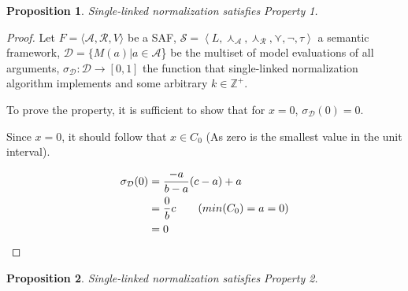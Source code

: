 \documentclass{article}
\newtheorem{proposition}{Proposition}
\newcommand{\real}{\mathbb{R}}  %
\newcommand{\args}{\mathcal{A}} %
\newcommand{\att}{\mathcal{R}}  %
\newcommand{\valueset}{L}
\newcommand{\safid}{F}               %
\newcommand{\saf}{\safid = \safbody} %
\newcommand{\safbody}{\langle \args, \att, V \rangle} %
\newcommand{\sembodyNew}{\left\langle \valueset,\SAFand_\mathcal{A}, \SAFand_\mathcal{R},\SAFor,\lnot,\tau \right\rangle} %
\newcommand{\SAFand}{\curlywedge}     %
\newcommand{\SAFor}{\curlyvee}        %
\newcommand{\sem}{\mathcal{S}}
\newcommand{\dataset}{\mathcal{D}}   %
\begin{document}
\begin{proposition}
Single-linked normalization satisfies Property 1.
\end{proposition}

\begin{proof}
Let $\saf$ be a SAF, $\sem = \sembodyNew$ a semantic framework, $\dataset = \{M(a)|a \in \args$\} be the multiset of model evaluations of all arguments, $\sigma_{\dataset}: \dataset  \rightarrow  [0,1]$ the function that single-linked normalization algorithm implements and some arbitrary $k \in \mathbb{Z}^{+}$. %


To prove the property, it is sufficient to show that for $x= 0$, $\sigma_{\dataset}(0)=0$.

Since $x = 0$, it should follow that $x \in C_0$ (As zero is the smallest value in the unit interval).

\begin{align*}
  \sigma_{\dataset}(0) 
  &= \dfrac{-a}{b-a} (c-a) + a
  \\ &=\dfrac{0}{b} c                   \tag{$min(C_0) = a = 0$}
  \\ &= 0                  \>    \qedhere
\end{align*}
 
\end{proof}

\begin{proposition}
Single-linked normalization satisfies Property 2.
\end{proposition}
\end{document}
